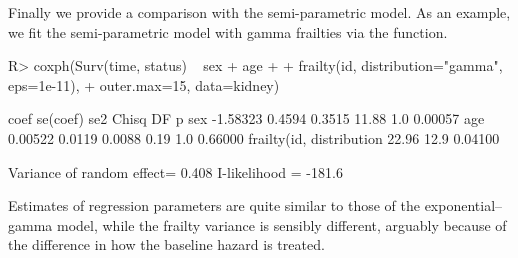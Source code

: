   
Finally we provide a comparison with the semi-parametric model.
As an example, we fit the semi-parametric model with gamma frailties via the  function.
\begin{CodeChunk}
\begin{CodeInput}
R> coxph(Surv(time, status) ~ sex + age +
+        frailty(id, distribution="gamma", eps=1e-11),
+        outer.max=15, data=kidney)
\end{CodeInput}
\begin{CodeOutput}
                         coef     se(coef) se2    Chisq DF   p      
sex                       -1.58323 0.4594   0.3515 11.88  1.0 0.00057
age                        0.00522 0.0119   0.0088  0.19  1.0 0.66000
frailty(id, distribution                           22.96 12.9 0.04100

     Variance of random effect= 0.408   I-likelihood = -181.6 
\end{CodeOutput}
\end{CodeChunk}

Estimates of regression parameters are quite similar to those of the exponential--gamma model,
  while the frailty variance is sensibly different,
  arguably because of the difference in how the baseline hazard is treated.
